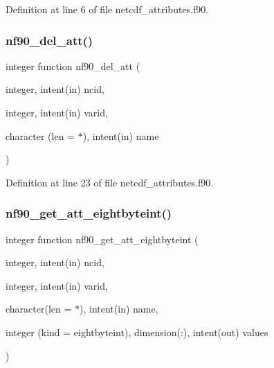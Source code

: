 Definition at line 6 of file netcdf\+\_\+attributes.\+f90.

\mbox{\label{netcdf__attributes_8f90_a27a298344fcf932fe450ff4d7a070ceb}} 
\subsubsection{\texorpdfstring{nf90\+\_\+del\+\_\+att()}{nf90\_del\_att()}}
{\footnotesize\ttfamily integer function nf90\+\_\+del\+\_\+att (\begin{DoxyParamCaption}\item[{integer, intent(in)}]{ncid,  }\item[{integer, intent(in)}]{varid,  }\item[{character (len = $\ast$), intent(in)}]{name }\end{DoxyParamCaption})}



Definition at line 23 of file netcdf\+\_\+attributes.\+f90.

\mbox{\label{netcdf__attributes_8f90_a598f57d833a84635e8d676911113bfff}} 
\subsubsection{\texorpdfstring{nf90\+\_\+get\+\_\+att\+\_\+eightbyteint()}{nf90\_get\_att\_eightbyteint()}}
{\footnotesize\ttfamily integer function nf90\+\_\+get\+\_\+att\+\_\+eightbyteint (\begin{DoxyParamCaption}\item[{integer, intent(in)}]{ncid,  }\item[{integer, intent(in)}]{varid,  }\item[{character(len = $\ast$), intent(in)}]{name,  }\item[{integer (kind = eightbyteint), dimension(\+:), intent(out)}]{values }\end{DoxyParamCaption})}



